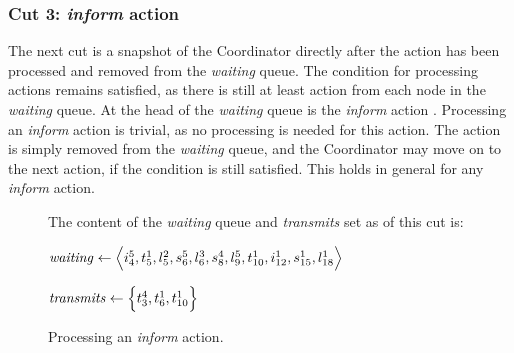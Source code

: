 \subsubsection{Cut 3: \textit{inform} action}
The next cut is a snapshot of the Coordinator directly after the  action has been processed and
removed from the \textit{waiting} queue. The condition for processing actions remains satisfied, as there is
still at least action from each node in the \textit{waiting} queue. At the head of the \textit{waiting} queue
is the \textit{inform} action . Processing an \textit{inform} action is trivial, as no processing is
needed for this action. The action is simply removed from the \textit{waiting} queue, and the Coordinator may
move on to the next action, if the condition is still satisfied. This holds in general for any \textit{inform}
action. %

\begin{figure}[H]
    \caption{Processing an \textit{inform} action.}\label{tikz:coordinatormsc3}
     \par

    \begin{minipage}[h]{14.5cm}
        The content of the \textit{waiting} queue and \textit{transmits} set as of this cut is: \smallbreak

        $\mathit{waiting} \leftarrow \Big\langle i^{5}_{4}, t^{1}_{5}, l^{2}_{5}, s^{5}_{6}, l^{3}_{6}, s^{4}_{8},
            l^{5}_{9}, t^{1}_{10}, i^{1}_{12}, s^{1}_{15}, l^{1}_{18} \Big\rangle$

        $\mathit{transmits} \leftarrow \Big\{ t^{4}_{3}, t^{1}_{6}, t^{1}_{10} \Big\}$
    \end{minipage}
\end{figure}


